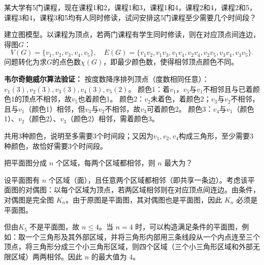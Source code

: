 \begin{example}{}{}
    某大学有5门课程，现在课程1和2，课程1和3，课程1和4，课程2和4，课程2和5，课程3和4，课程3和5均有人同时修读，试问安排这5门课程至少需要几个时间段？
\end{example}
建立图模型。以课程为顶点，若两门课程有学生同时修读，则在对应顶点间连边，得图$G$：
\[
V(G)=\{v_1,v_2,v_3,v_4,v_5\},\quad
E(G)=\{v_1v_2,v_1v_3,v_1v_4,v_2v_4,v_2v_5,v_3v_4,v_3v_5\}.
\]
问题转化为求$G$的点色数$\chi(G)$，即最少颜色数，使得相邻顶点颜色不同。

\textbf{韦尔奇鲍威尔算法验证：}
 按度数降序排列顶点（度数相同任意）：$v_1(3),v_2(3),v_3(3),v_4(3),v_5(2)$。
 颜色1：着$v_1$，$v_5$与$v_1$不相邻且与已着颜色1的顶点不相邻，故$v_5$也着颜色1。
 颜色2：$v_2$未着色，着颜色2；$v_3$与$v_2$不相邻，且与$v_1$（颜色1）相邻，但$v_3$与$v_2$不相邻，故$v_3$可着颜色2。
 颜色3：$v_4$与$v_1$（颜色1）、$v_2$（颜色2）、$v_3$（颜色2）相邻，需着颜色3。

共用3种颜色，说明至多需要3个时间段；又因为$v_1,v_2,v_4$构成三角形，至少需要3种颜色，故恰好需要3个时间段。
\begin{example}{}{}
把平面图分成 $n$ 个区域，每两个区域都相邻，则 $n$ 最大为？
\end{example}
设平面图有 $n$ 个区域（面），且任意两个区域都相邻（即共享一条边）。考虑该平面图的对偶图：以每个区域为顶点，若两区域相邻则在对应顶点间连边。由条件，对偶图是完全图 $K_n$。由于原图是平面图，其对偶图也是平面图，因此 $K_n$ 必须是平面图。

但由$K_5$ 不是平面图，故 $n \le 4$。当 $n=4$ 时，可以构造满足条件的平面图，例如：取一个三角形及其外部区域，并将三角形内部用三条线段从一个内点连至三个顶点，将三角形分成三个小三角形区域，则四个区域（三个小三角形区域和外部无限区域）两两相邻。因此 $n$ 的最大值为 $4$。

\newpage
